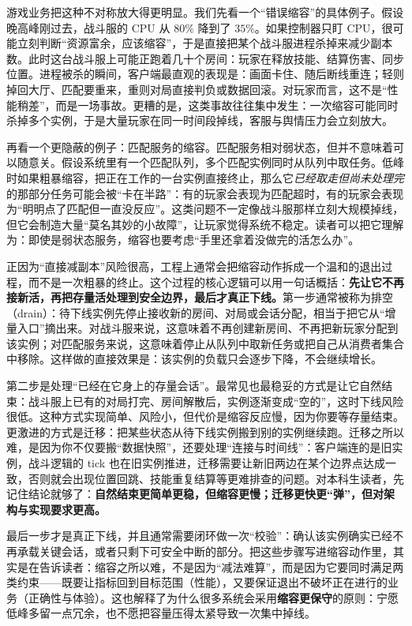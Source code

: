 游戏业务把这种不对称放大得更明显。我们先看一个“错误缩容”的具体例子。假设晚高峰刚过去，战斗服的 CPU 从 $80\%$ 降到了 $35\%$。如果控制器只盯 CPU，很可能立刻判断“资源富余，应该缩容”，于是直接把某个战斗服进程杀掉来减少副本数。此时这台战斗服上可能正跑着几十个房间：玩家在释放技能、结算伤害、同步位置。进程被杀的瞬间，客户端最直观的表现是：画面卡住、随后断线重连；轻则掉回大厅、匹配要重来，重则对局直接判负或数据回滚。对玩家而言，这不是“性能稍差”，而是一场事故。更糟的是，这类事故往往集中发生：一次缩容可能同时杀掉多个实例，于是大量玩家在同一时间段掉线，客服与舆情压力会立刻放大。

再看一个更隐蔽的例子：匹配服务的缩容。匹配服务相对弱状态，但并不意味着可以随意关。假设系统里有一个匹配队列，多个匹配实例同时从队列中取任务。低峰时如果粗暴缩容，把正在工作的一台实例直接终止，那么它\emph{已经取走但尚未处理完}的那部分任务可能会被“卡在半路”：有的玩家会表现为匹配超时，有的玩家会表现为“明明点了匹配但一直没反应”。这类问题不一定像战斗服那样立刻大规模掉线，但它会制造大量“莫名其妙的小故障”，让玩家觉得系统不稳定。读者可以把它理解为：即使是弱状态服务，缩容也要考虑“手里还拿着没做完的活怎么办”。

正因为“直接减副本”风险很高，工程上通常会把缩容动作拆成一个温和的退出过程，而不是一次粗暴的终止。这个过程的核心逻辑可以用一句话概括：\textbf{先让它不再接新活，再把存量活处理到安全边界，最后才真正下线。}第一步通常被称为排空（drain）：待下线实例先停止接收新的房间、对局或会话分配，相当于把它从“增量入口”摘出来。对战斗服来说，这意味着不再创建新房间、不再把新玩家分配到该实例；对匹配服务来说，这意味着停止从队列中取新任务或把自己从消费者集合中移除。这样做的直接效果是：该实例的负载只会逐步下降，不会继续增长。

第二步是处理“已经在它身上的存量会话”。最常见也最稳妥的方式是让它自然结束：战斗服上已有的对局打完、房间解散后，实例逐渐变成“空的”，这时下线风险很低。这种方式实现简单、风险小，但代价是缩容反应慢，因为你要等存量结束。更激进的方式是迁移：把某些状态从待下线实例搬到别的实例继续跑。迁移之所以难，是因为你不仅要搬“数据快照”，还要处理“连接与时间线”：客户端连的是旧实例，战斗逻辑的 tick 也在旧实例推进，迁移需要让新旧两边在某个边界点达成一致，否则就会出现位置回跳、技能重复结算等更难排查的问题。对本科生读者，先记住结论就够了：\textbf{自然结束更简单更稳，但缩容更慢；迁移更快更“弹”，但对架构与实现要求更高。}

最后一步才是真正下线，并且通常需要闭环做一次“校验”：确认该实例确实已经不再承载关键会话，或者只剩下可安全中断的部分。把这些步骤写进缩容动作里，其实是在告诉读者：缩容之所以难，不是因为“减法难算”，而是因为它要同时满足两类约束——既要让指标回到目标范围（性能），又要保证退出不破坏正在进行的业务（正确性与体验）。这也解释了为什么很多系统会采用\textbf{缩容更保守}的原则：宁愿低峰多留一点冗余，也不愿把容量压得太紧导致一次集中掉线。

